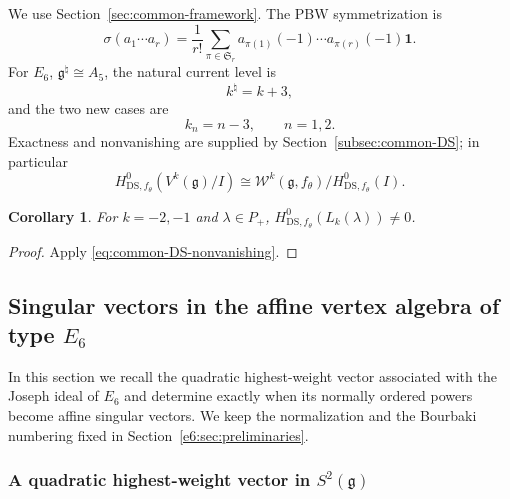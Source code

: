 \documentclass[11pt,reqno]{amsart}
\newtheorem{corollary}[theorem]{Corollary}
\theoremstyle{definition}
\theoremstyle{remark}
\begin{document}
We use Section~\ref{sec:common-framework}.  The PBW symmetrization is
\begin{equation}
\label{e6:eq:symmetrization-map}
 \sigma(a_1\cdots a_r)=\frac1{r!}\sum_{\pi\in\mathfrak S_r}
 a_{\pi(1)}(-1)\cdots a_{\pi(r)}(-1)\mathbf1.
\end{equation}
For $E_6$, $\mathfrak g^\natural\cong A_5$, the natural current level is
\begin{equation}
 k^\natural=k+3,
 \label{e6:eq:natural-level}
\end{equation}
and the two new cases are
\begin{equation}
 k_n=n-3,\qquad n=1,2.
 \label{e6:eq:distinguished-levels}
\end{equation}
Exactness and nonvanishing are supplied by
Section~\ref{subsec:common-DS}; in particular
\begin{equation*}
 H^0_{\mathrm{DS},f_\theta}(V^k(\mathfrak g)/I)
 \cong\mathcal W^k(\mathfrak g,f_\theta)/H^0_{\mathrm{DS},f_\theta}(I).
\end{equation*}
\begin{corollary}
\label{e6:cor:negative-level-nonvanishing}
For $k=-2,-1$ and $\lambda\in P_+$,
$H^0_{\mathrm{DS},f_\theta}(L_k(\lambda))\ne0$.
\end{corollary}
\begin{proof}
Apply \eqref{eq:common-DS-nonvanishing}.
\end{proof}

\subsection{Singular vectors in the affine vertex algebra of type \texorpdfstring{$E_6$}{E6}}
\label{e6:sec:singular-vectors}

In this section we recall the quadratic highest-weight vector associated with the
Joseph ideal of $E_6$ and determine exactly when its normally ordered powers become
affine singular vectors.  We keep the normalization and the Bourbaki numbering fixed
in Section~\ref{e6:sec:preliminaries}.

\subsubsection{A quadratic highest-weight vector in \texorpdfstring{$S^2(\mathfrak g)$}{S2(g)}}
\end{document}
